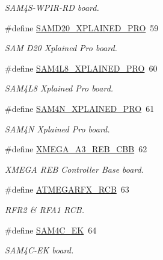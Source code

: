 \begin{DoxyCompactItemize}
\begin{DoxyCompactList}\small\item\em S\+A\+M4\+S-\/\+W\+P\+I\+R-\/\+RD board. \end{DoxyCompactList}\item 
\#define \mbox{\hyperlink{group__group__common__boards_ga9ed87b2aa66124d5d356cc4404c7d284}{S\+A\+M\+D20\+\_\+\+X\+P\+L\+A\+I\+N\+E\+D\+\_\+\+P\+RO}}~59
\begin{DoxyCompactList}\small\item\em S\+AM D20 Xplained Pro board. \end{DoxyCompactList}\item 
\#define \mbox{\hyperlink{group__group__common__boards_ga246d0c0d1974cbd0c63e0a4fe40012c7}{S\+A\+M4\+L8\+\_\+\+X\+P\+L\+A\+I\+N\+E\+D\+\_\+\+P\+RO}}~60
\begin{DoxyCompactList}\small\item\em S\+A\+M4\+L8 Xplained Pro board. \end{DoxyCompactList}\item 
\#define \mbox{\hyperlink{group__group__common__boards_ga905c06122e15a4f8172b3639c1be5baa}{S\+A\+M4\+N\+\_\+\+X\+P\+L\+A\+I\+N\+E\+D\+\_\+\+P\+RO}}~61
\begin{DoxyCompactList}\small\item\em S\+A\+M4N Xplained Pro board. \end{DoxyCompactList}\item 
\#define \mbox{\hyperlink{group__group__common__boards_gaee222842346e1ce3a246eed006f89f5f}{X\+M\+E\+G\+A\+\_\+\+A3\+\_\+\+R\+E\+B\+\_\+\+C\+BB}}~62
\begin{DoxyCompactList}\small\item\em X\+M\+E\+GA R\+EB Controller Base board. \end{DoxyCompactList}\item 
\#define \mbox{\hyperlink{group__group__common__boards_ga5befa897d066ccfed69727a7fc78f213}{A\+T\+M\+E\+G\+A\+R\+F\+X\+\_\+\+R\+CB}}~63
\begin{DoxyCompactList}\small\item\em R\+F\+R2 \& R\+F\+A1 R\+CB. \end{DoxyCompactList}\item 
\#define \mbox{\hyperlink{group__group__common__boards_gaba253352d226dce72a7c9496e1b735a2}{S\+A\+M4\+C\+\_\+\+EK}}~64
\begin{DoxyCompactList}\small\item\em S\+A\+M4\+C-\/\+EK board. \end{DoxyCompactList}\item 

\end{DoxyCompactItemize}
